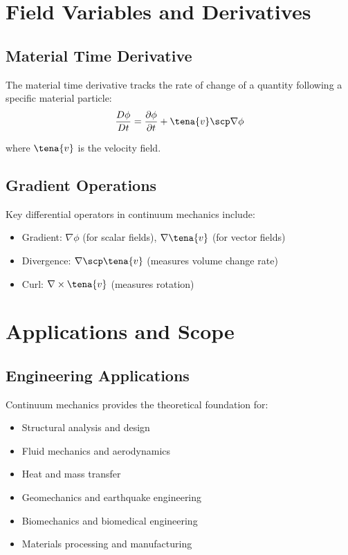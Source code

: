 \section{Field Variables and Derivatives}

\subsection{Material Time Derivative}

The material time derivative tracks the rate of change of a quantity following a specific material particle:
$$\frac{D\phi}{Dt} = \frac{\partial \phi}{\partial t} + \tena{v} \scp \nabla \phi$$

where $\tena{v}$ is the velocity field.

\subsection{Gradient Operations}

Key differential operators in continuum mechanics include:
\begin{itemize}
\item Gradient: $\nabla \phi$ (for scalar fields), $\nabla \tena{v}$ (for vector fields)
\item Divergence: $\nabla \scp \tena{v}$ (measures volume change rate)
\item Curl: $\nabla \times \tena{v}$ (measures rotation)
\end{itemize}

\section{Applications and Scope}

\subsection{Engineering Applications}

Continuum mechanics provides the theoretical foundation for:
\begin{itemize}
\item Structural analysis and design
\item Fluid mechanics and aerodynamics
\item Heat and mass transfer
\item Geomechanics and earthquake engineering
\item Biomechanics and biomedical engineering
\item Materials processing and manufacturing
\end{itemize}

